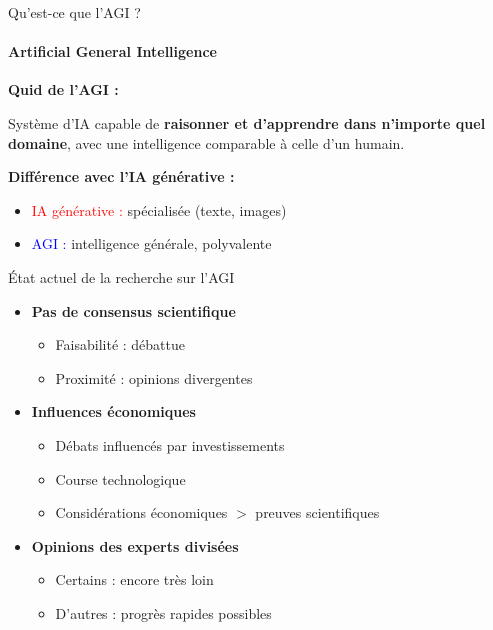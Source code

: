 \begin{frame}{Qu'est-ce que l'AGI ?}
\framesubtitle{Artificial General Intelligence}

\textbf{Quid de l'AGI :}

\vspace{0.3cm}

Système d'IA capable de \textbf{raisonner et d'apprendre dans n'importe quel domaine}, avec une intelligence comparable à celle d'un humain.

\vspace{0.5cm}

\textbf{Différence avec l'IA générative :}

\begin{itemize}
    \item \textcolor{red}{IA générative :} spécialisée (texte, images)
    \item \textcolor{blue}{AGI :} intelligence générale, polyvalente
\end{itemize}

\end{frame}

\begin{frame}{État actuel de la recherche sur l'AGI}

\begin{itemize}
    \item<+-> \textbf{Pas de consensus scientifique}
        \begin{itemize}
            \item Faisabilité : débattue
            \item Proximité : opinions divergentes
        \end{itemize}

    \vspace{0.2cm}
    \item<+-> \textbf{Influences économiques}
        \begin{itemize}
            \item Débats influencés par investissements
            \item Course technologique
            \item Considérations économiques $>$ preuves scientifiques
        \end{itemize}

    \vspace{0.2cm}
    \item<+-> \textbf{Opinions des experts divisées}
        \begin{itemize}
            \item Certains : encore très loin
            \item D'autres : progrès rapides possibles
        \end{itemize}
\end{itemize}

\end{frame}

